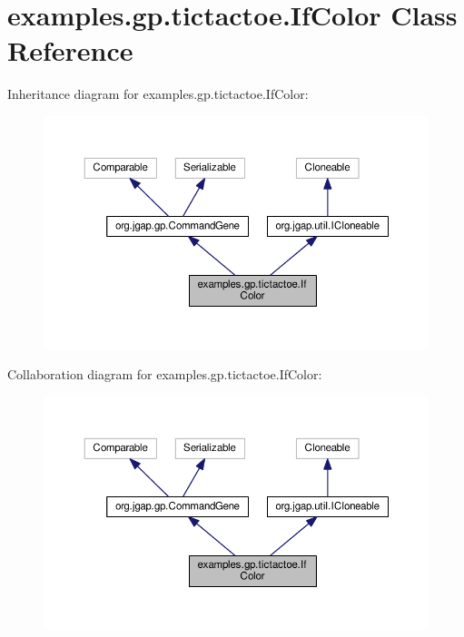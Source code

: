 \hypertarget{classexamples_1_1gp_1_1tictactoe_1_1_if_color}{\section{examples.\-gp.\-tictactoe.\-If\-Color Class Reference}
\label{classexamples_1_1gp_1_1tictactoe_1_1_if_color}
}


Inheritance diagram for examples.\-gp.\-tictactoe.\-If\-Color\-:
\nopagebreak
\begin{figure}[H]
\begin{center}
\leavevmode
\includegraphics[width=350pt]{classexamples_1_1gp_1_1tictactoe_1_1_if_color__inherit__graph}
\end{center}
\end{figure}


Collaboration diagram for examples.\-gp.\-tictactoe.\-If\-Color\-:
\nopagebreak
\begin{figure}[H]
\begin{center}
\leavevmode
\includegraphics[width=350pt]{classexamples_1_1gp_1_1tictactoe_1_1_if_color__coll__graph}
\end{center}
\end{figure}
